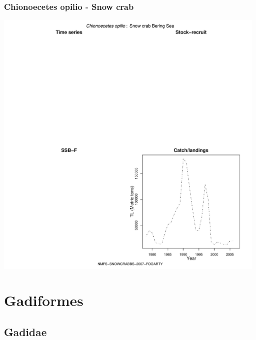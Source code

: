\subsubsection{Chionoecetes opilio - Snow crab}
\begin{center}
\includegraphics[width=1.2\textwidth]{../R/figures/NMFS-SNOWCRABBS-2007-FOGARTY.pdf}
\end{center}

\section{Gadiformes}

\subsection{Gadidae}

